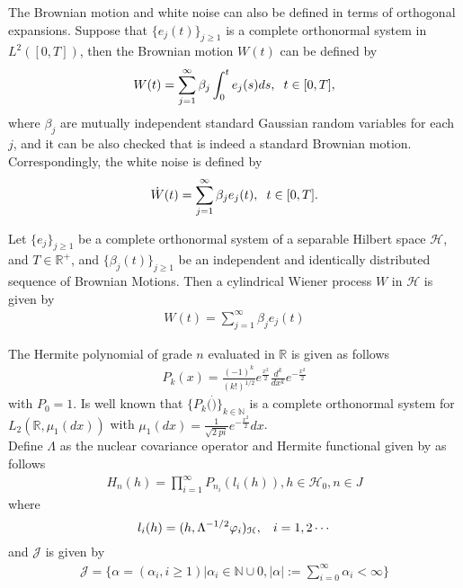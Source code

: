 	\noindent The Brownian motion and white noise can also be defined in terms of orthogonal expansions. Suppose that $\{e_j (t)\}_{j \geq 1}$ is a complete orthonormal system in $L^2 ([0, T ])$, then the Brownian motion $W(t)$ can be defined by
	\begin{align}
	    W(t) = \displaystyle \sum_{j=1}^{\infty} \beta_j \int_{0}^{t} e_j (s) ds, \hspace{2mm} t \in [0, T],
	\end{align}
	where $\beta_j$ are mutually independent standard Gaussian random variables for each $j$, and it can be also checked that is indeed a standard Brownian motion. Correspondingly, the white noise is defined by
	\begin{align}
	    \dot{W}(t) = \displaystyle \sum_{j=1}^{\infty} \beta_j e_j (t), \hspace{2mm} t \in [0, T].
    \end{align}

	\begin{definition}
		\label{cylindrical}
		Let $\{e_j\}_{j \geq 1}$ be a complete orthonormal  system of a separable Hilbert space $\mathcal{H}$, and $T \in \mathbb{R}^+$, and $\{\beta_j (t)\}_{j \geq 1}$ be an independent and identically distributed sequence of Brownian Motions. Then a cylindrical Wiener process $W$ in $\mathcal{H}$ is given by
		\begin{align*}
			W(t) = \displaystyle \sum_{j=1}^{\infty} \beta_j e_j (t)
		\end{align*}	
	\end{definition}
	
	The Hermite polynomial of grade $n$ evaluated in $\mathbb{R}$ is given as follows
	\begin{align}
		\label{hermite_polynomials}
		P_k(x) = \frac{(-1)^k}{(k!)^{1/2}} e^{\frac{x^2}{2}} \frac{d^k}{dx^k} e^{-\frac{x^2}{2}}
	\end{align}
	with $P_0 = 1$. Is well known that $\{P_k (\dot) \}_{k \in \mathbb{N}}$ is a complete orthonormal system for $L_2 (\mathbb{R}, \mu_1 (dx))$ with $\mu_1 (dx) = \frac{1}{\sqrt{2 \ pi}} e^{- \frac{x^2}{2}} dx$.\\
	
	Define $\Lambda$ as the nuclear covariance operator and Hermite functional given by as follows
	\begin{align}
	\label{hermite_funcionals}
		H_n(h) = \prod_{i=1}^{\infty} P_{n_i} (l_i (h)), h \in \mathcal{H}_0 , n \in J
	\end{align}
	where
	\begin{equation*}
		l_i (h) = ( h, \Lambda^{-1/2} \varphi_i )_{\mathcal{H}}, \hspace{3mm} i = 1,2 \cdots
	\end{equation*}
	and $\mathcal{J}$ is given by
	\begin{align}
		\mathcal{J} = \{\alpha = (\alpha_i,i \geq 1) | \alpha_i \in \mathbb{N}\cup {0}, |\alpha|:= \displaystyle \sum _{i = 0}^{\infty}\alpha_i < \infty\}
	\end{align}
	
